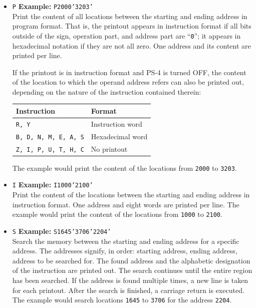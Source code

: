 \begin{itemize}
\item \texttt{P}
\textbf{Example:} \texttt{P2000'3203'} \\
Print the content of all locations between the starting and ending address in program format. That is, the printout appears in instruction format if all bits outside of the sign, operation part, and address part are ``\texttt{0}''; it appears in hexadecimal notation if they are not all zero. One address and its content are printed per line.

If the printout is in instruction format and PS-4 is turned OFF, the content of the location to which the operand address refers can also be printed out, depending on the nature of the instruction contained therein:

\begin{table}[h!]
\centering
\begin{tabular}{ll}
\toprule
\textbf{Instruction} & \textbf{Format} \\
\midrule
\texttt{R, Y} & Instruction word \\
\texttt{B, D, N, M, E, A, S} & Hexadecimal word \\
\texttt{Z, I, P, U, T, H, C} & No printout \\
\bottomrule
\end{tabular}
\end{table}
The example would print the content of the locations from \texttt{2000} to \texttt{3203}.

\item \texttt{I}
\textbf{Example:} \texttt{I1000'2100'} \\
Print the content of the locations between the starting and ending address in instruction format. One address and eight words are printed per line. The example would print the content of the locations from \texttt{1000} to \texttt{2100}.

\item \texttt{S}
\textbf{Example:} \texttt{S1645'3706'2204'} \\
Search the memory between the starting and ending address for a specific address. The addresses signify, in order: starting address, ending address, address to be searched for. The found address and the alphabetic designation of the instruction are printed out. The search continues until the entire region has been searched. If the address is found multiple times, a new line is taken for each printout. After the search is finished, a carriage return is executed. The example would search locations \texttt{1645} to \texttt{3706} for the address \texttt{2204}.


\end{itemize}
